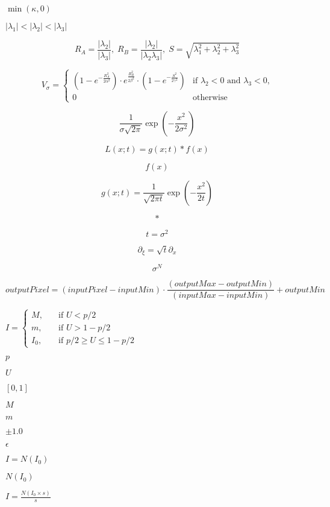 \documentclass{article}
\begin{document}
$ \min(\kappa,0) $
\pagebreak

$ | \lambda_1 | < | \lambda_2 | < |\lambda_3 | $
\pagebreak

\[ R_A = \frac{|\lambda_2|}{|\lambda_3|}, \; R_B = \frac{|\lambda_2|}{|\lambda_2\lambda_3|}, \; S = \sqrt{\lambda_1^2+\lambda_2^2+\lambda_3^2} \]
\pagebreak

\[ V_{\sigma}= \begin{cases} (1-e^{-\frac{R_A^2}{2\alpha^2}}) \cdot e^{\frac{R_B^2}{2\beta^2}} \cdot (1-e^{-\frac{S^2}{2\gamma^2}}) & \text{if } \lambda_2<0 \text{ and } \lambda_3<0 \text{,}\\ 0 & \text{otherwise} \end{cases} \]
\pagebreak

\[ \frac{ 1 }{ \sigma \sqrt{ 2 \pi } } \exp{ \left( - \frac{x^2}{ 2 \sigma^2 } \right) } \]
\pagebreak

\[ L(x; t) = g(x; t) \ast f(x) \]
\pagebreak

\[ f(x) \]
\pagebreak

\[ g(x; t) = \frac{1}{ \sqrt{ 2 \pi t} } \exp{ \left( -\frac{x^2}{ 2 t } \right) } \]
\pagebreak

\[\ast\]
\pagebreak

\[ t = \sigma^2 \]
\pagebreak

\[ \partial_\xi = \sqrt{t} \partial_x \]
\pagebreak

\[ \sigma^N \]
\pagebreak

\[ outputPixel = ( inputPixel - inputMin) \cdot \frac{(outputMax - outputMin )}{(inputMax - inputMin)} + outputMin \]
\pagebreak

$ I = \begin{cases} M, & \quad \text{if } U < p/2 \\ m, & \quad \text{if } U > 1 - p/2 \\ I_0, & \quad \text{if } p/2 \geq U \leq 1 - p/2 \end{cases} $
\pagebreak

$ p $
\pagebreak

$ U $
\pagebreak

$ [0,1] $
\pagebreak

$ M $
\pagebreak

$ m $
\pagebreak

$\pm 1.0$
\pagebreak

$ \epsilon $
\pagebreak

$ I = N(I_0) $
\pagebreak

$ N(I_0) $
\pagebreak

$ I = \frac{N(I_0 \times s)}{s} $
\pagebreak
\end{document}
